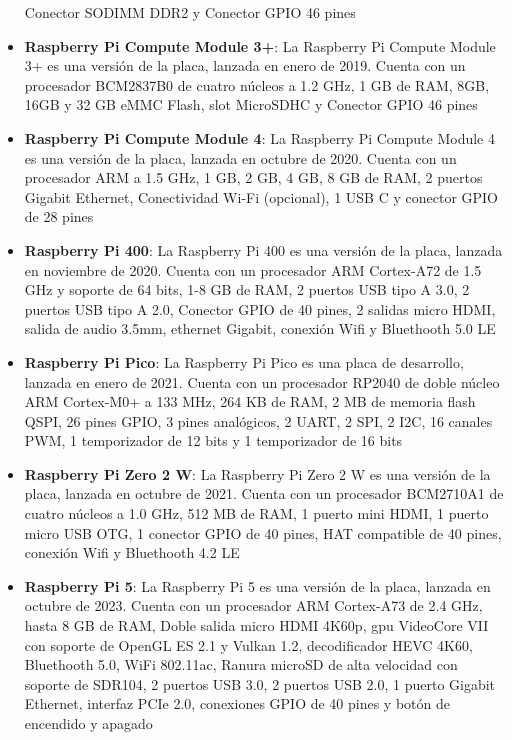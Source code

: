 \begin{itemize}
            Conector SODIMM DDR2 y Conector GPIO 46 pines \cite{Santamaria2023}
        \item \textbf{Raspberry Pi Compute Module 3+}: La Raspberry Pi Compute Module 3+ es una versi\'on de la placa,
            lanzada en enero de 2019. Cuenta con un procesador BCM2837B0 de cuatro n\'ucleos a 1.2 GHz, 1 GB de RAM, 8GB, 16GB y 32 GB eMMC Flash,
            slot MicroSDHC y Conector GPIO 46 pines \cite{Santamaria2023}
        \item \textbf{Raspberry Pi Compute Module 4}: La Raspberry Pi Compute Module 4 es una versi\'on de la placa,
            lanzada en octubre de 2020. Cuenta con un procesador ARM a 1.5 GHz, 1 GB, 2 GB, 4 GB, 8 GB de RAM,
            2 puertos Gigabit Ethernet, Conectividad Wi-Fi (opcional), 1 USB C y conector GPIO de 28 pines \cite{Santamaria2023}
        \item \textbf{Raspberry Pi 400}: La Raspberry Pi 400 es una versi\'on de la placa, lanzada en noviembre de 2020.
            Cuenta con un procesador ARM Cortex-A72 de 1.5 GHz y soporte de 64 bits, 1-8 GB de RAM, 2 puertos USB tipo A 3.0, 2 puertos USB tipo A 2.0,
            Conector GPIO de 40 pines, 2 salidas micro HDMI, salida de audio 3.5mm, ethernet Gigabit, conexi\'on Wifi y Bluethooth 5.0 LE \cite{Santamaria2023}
        \item \textbf{Raspberry Pi Pico}: La Raspberry Pi Pico es una placa de desarrollo, lanzada en enero de 2021.
            Cuenta con un procesador RP2040 de doble n\'ucleo ARM Cortex-M0+ a 133 MHz, 264 KB de RAM, 2 MB de memoria flash QSPI,
            26 pines GPIO, 3 pines anal\'ogicos, 2 UART, 2 SPI, 2 I2C, 16 canales PWM, 1 temporizador de 12 bits y 1 temporizador de 16 bits \cite{Santamaria2023}
        \item \textbf{Raspberry Pi Zero 2 W}: La Raspberry Pi Zero 2 W es una versi\'on de la placa, lanzada en octubre de 2021.
            Cuenta con un procesador BCM2710A1 de cuatro n\'ucleos a 1.0 GHz, 512 MB de RAM, 1 puerto mini HDMI, 1 puerto micro USB OTG, 1 conector GPIO de 40 pines, HAT compatible de 40 pines,
            conexi\'on Wifi y Bluethooth 4.2 LE \cite{Santamaria2023}
        \item \textbf{Raspberry Pi 5}: La Raspberry Pi 5 es una versi\'on de la placa, lanzada en octubre de 2023. 
            Cuenta con un procesador ARM Cortex-A73 de 2.4 GHz, hasta 8 GB de RAM, Doble salida micro HDMI 4K60p, gpu VideoCore VII con soporte 
            de OpenGL ES 2.1 y Vulkan 1.2, decodificador HEVC 4K60, Bluethooth 5.0, WiFi 802.11ac, Ranura microSD de alta velocidad con soporte de SDR104, 
            2 puertos USB 3.0, 2 puertos USB 2.0, 1 puerto Gigabit Ethernet, interfaz PCIe 2.0, conexiones GPIO de 40 pines y bot\'on de encendido y apagado \cite{Santamaria2023}
    \end{itemize}
    